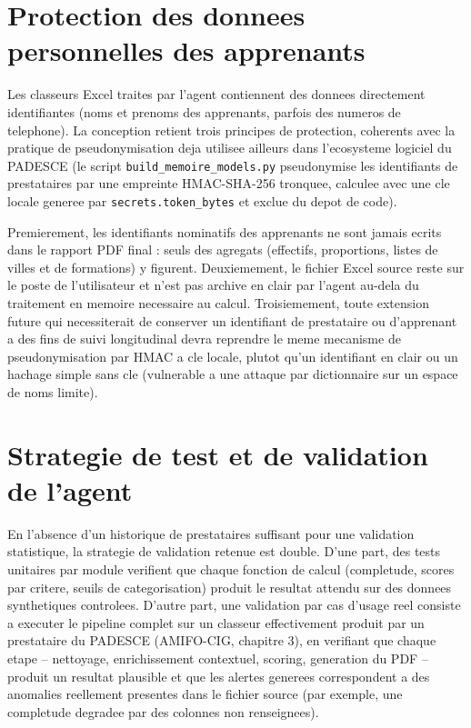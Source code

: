 \documentclass[12pt,a4paper,twoside,openany]{report}
\begin{document}
\section{Protection des donnees personnelles des apprenants}

Les classeurs Excel traites par l'agent contiennent des donnees directement identifiantes (noms et prenoms des apprenants, parfois des numeros de telephone). La conception retient trois principes de protection, coherents avec la pratique de pseudonymisation deja utilisee ailleurs dans l'ecosysteme logiciel du PADESCE (le script \texttt{build\_memoire\_models.py} pseudonymise les identifiants de prestataires par une empreinte HMAC-SHA-256 tronquee, calculee avec une cle locale generee par \texttt{secrets.token\_bytes} et exclue du depot de code).

Premierement, les identifiants nominatifs des apprenants ne sont jamais ecrits dans le rapport PDF final : seuls des agregats (effectifs, proportions, listes de villes et de formations) y figurent. Deuxiemement, le fichier Excel source reste sur le poste de l'utilisateur et n'est pas archive en clair par l'agent au-dela du traitement en memoire necessaire au calcul. Troisiemement, toute extension future qui necessiterait de conserver un identifiant de prestataire ou d'apprenant a des fins de suivi longitudinal devra reprendre le meme mecanisme de pseudonymisation par HMAC a cle locale, plutot qu'un identifiant en clair ou un hachage simple sans cle (vulnerable a une attaque par dictionnaire sur un espace de noms limite).

\section{Strategie de test et de validation de l'agent}

En l'absence d'un historique de prestataires suffisant pour une validation statistique, la strategie de validation retenue est double. D'une part, des tests unitaires par module verifient que chaque fonction de calcul (completude, scores par critere, seuils de categorisation) produit le resultat attendu sur des donnees synthetiques controlees. D'autre part, une validation par cas d'usage reel consiste a executer le pipeline complet sur un classeur effectivement produit par un prestataire du PADESCE (AMIFO-CIG, chapitre 3), en verifiant que chaque etape -- nettoyage, enrichissement contextuel, scoring, generation du PDF -- produit un resultat plausible et que les alertes generees correspondent a des anomalies reellement presentes dans le fichier source (par exemple, une completude degradee par des colonnes non renseignees).
\end{document}

